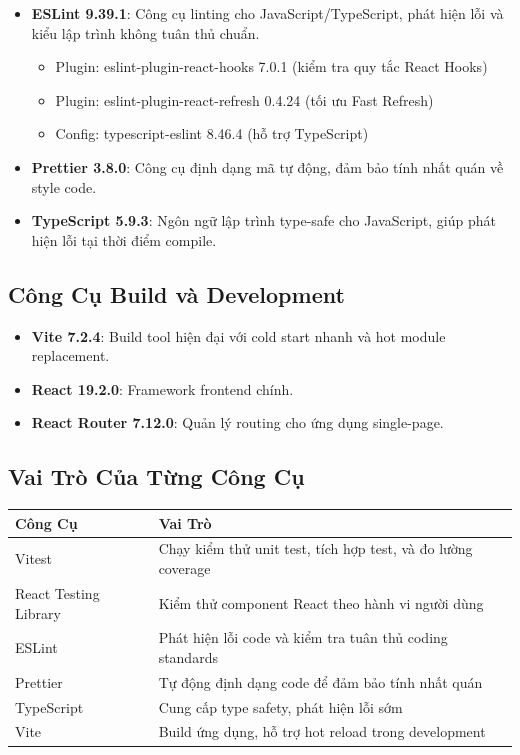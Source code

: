 \documentclass[12pt,a4paper,vietnamese]{article}
\begin{document}
\begin{itemize}
    \item \textbf{ESLint 9.39.1}: Công cụ linting cho JavaScript/TypeScript, phát hiện lỗi và kiểu lập trình không tuân thủ chuẩn.
    \begin{itemize}
        \item Plugin: eslint-plugin-react-hooks 7.0.1 (kiểm tra quy tắc React Hooks)
        \item Plugin: eslint-plugin-react-refresh 0.4.24 (tối ưu Fast Refresh)
        \item Config: typescript-eslint 8.46.4 (hỗ trợ TypeScript)
    \end{itemize}
    \item \textbf{Prettier 3.8.0}: Công cụ định dạng mã tự động, đảm bảo tính nhất quán về style code.
    \item \textbf{TypeScript 5.9.3}: Ngôn ngữ lập trình type-safe cho JavaScript, giúp phát hiện lỗi tại thời điểm compile.
\end{itemize}

\subsection{Công Cụ Build và Development}

\begin{itemize}
    \item \textbf{Vite 7.2.4}: Build tool hiện đại với cold start nhanh và hot module replacement.
    \item \textbf{React 19.2.0}: Framework frontend chính.
    \item \textbf{React Router 7.12.0}: Quản lý routing cho ứng dụng single-page.
\end{itemize}

\subsection{Vai Trò Của Từng Công Cụ}

\begin{table}[h]
\centering
\begin{tabular}{|L{3cm}|L{7cm}|}
\hline
\textbf{Công Cụ} & \textbf{Vai Trò} \\
\hline
Vitest & Chạy kiểm thử unit test, tích hợp test, và đo lường coverage \\
\hline
React Testing Library & Kiểm thử component React theo hành vi người dùng \\
\hline
ESLint & Phát hiện lỗi code và kiểm tra tuân thủ coding standards \\
\hline
Prettier & Tự động định dạng code để đảm bảo tính nhất quán \\
\hline
TypeScript & Cung cấp type safety, phát hiện lỗi sớm \\
\hline
Vite & Build ứng dụng, hỗ trợ hot reload trong development \\
\hline
\end{tabular}
\end{table}
\end{document}
